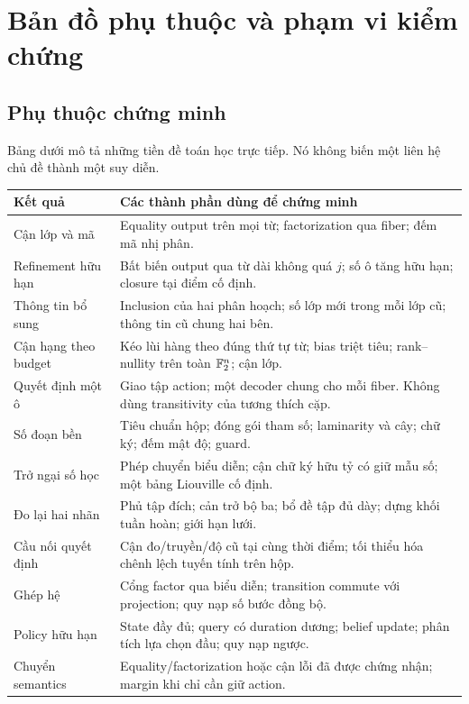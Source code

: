\section{Bản đồ phụ thuộc và phạm vi kiểm chứng}\label{app:verification}
\subsection{Phụ thuộc chứng minh}
Bảng dưới mô tả những tiền đề toán học trực tiếp. Nó không biến một liên hệ chủ đề thành một suy diễn.
\begin{longtable}{p{}p{}}
\toprule Kết quả & Các thành phần dùng để chứng minh\\\midrule\endhead
Cận lớp và mã & Equality output trên mọi từ; factorization qua fiber; đếm mã nhị phân.\\
Refinement hữu hạn & Bất biến output qua từ dài không quá $j$; số ô tăng hữu hạn; closure tại điểm cố định.\\
Thông tin bổ sung & Inclusion của hai phân hoạch; số lớp mới trong mỗi lớp cũ; thông tin cũ chung hai bên.\\
Cận hạng theo budget & Kéo lùi hàng theo đúng thứ tự từ; bias triệt tiêu; rank--nullity trên toàn $\mathbb F_2^n$; cận lớp.\\
Quyết định một ô & Giao tập action; một decoder chung cho mỗi fiber. Không dùng transitivity của tương thích cặp.\\
Số đoạn bền & Tiêu chuẩn hộp; đóng gói tham số; laminarity và cây; chữ ký; đếm mật độ; guard.\\
Trở ngại số học & Phép chuyển biểu diễn; cận chữ ký hữu tỷ có giữ mẫu số; một bảng Liouville cố định.\\
Đo lại hai nhãn & Phủ tập đích; cản trở bộ ba; bổ đề tập đủ dày; dựng khối tuần hoàn; giới hạn lưới.\\
Cầu nối quyết định & Cận đo/truyền/độ cũ tại cùng thời điểm; tối thiểu hóa chênh lệch tuyến tính trên hộp.\\
Ghép hệ & Cổng factor qua biểu diễn; transition commute với projection; quy nạp số bước đồng bộ.\\
Policy hữu hạn & State đầy đủ; query có duration dương; belief update; phân tích lựa chọn đầu; quy nạp ngược.\\
Chuyển semantics & Equality/factorization hoặc cận lỗi đã được chứng nhận; margin khi chỉ cần giữ action.\\
\bottomrule
\end{longtable}

